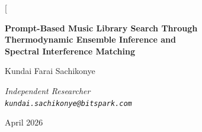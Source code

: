 \documentclass[11pt,twocolumn,a4paper]{article}
\begin{document}
\twocolumn[
\begin{@twocolumnfalse}
\begin{center}

{\LARGE\bfseries Prompt-Based Music Library Search Through\\[4pt]
Thermodynamic Ensemble Inference and\\[4pt]
Spectral Interference Matching}

\vspace{12pt}

{\large Kundai Farai Sachikonye}

\vspace{6pt}

{\small\itshape Independent Researcher \\[0.3em]
\texttt{kundai.sachikonye@bitspark.com}}

\vspace{6pt}

{\small April 2026}

\vspace{14pt}


\end{center}
\end{@twocolumnfalse}
\end{document}
